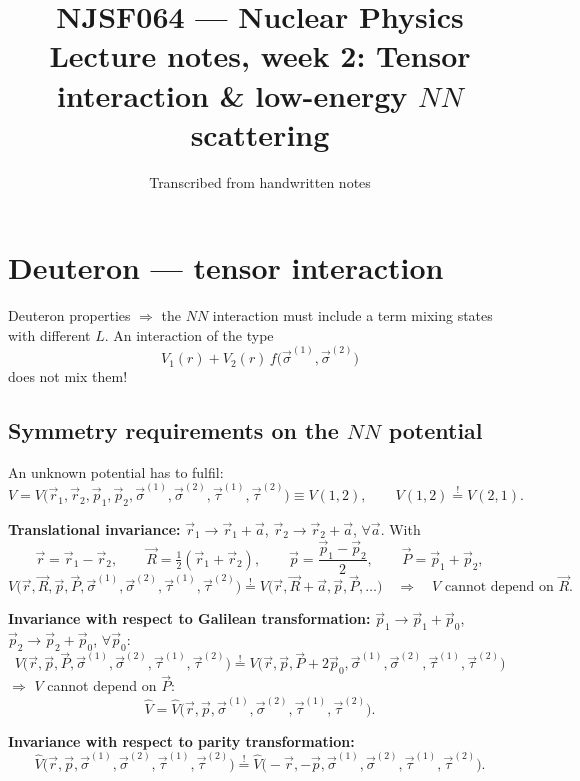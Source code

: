 \documentclass[11pt,a4paper]{article}
\title{NJSF064 --- Nuclear Physics\\[2mm]\large Lecture notes, week 2: Tensor interaction \& low-energy $NN$ scattering}
\author{Transcribed from handwritten notes}
\date{}
\newcommand{\op}[1]{\hat{#1}}
\begin{document}
\maketitle

\tableofcontents

\section{Deuteron --- tensor interaction}

Deuteron properties $\Rightarrow$ the $NN$ interaction must include a term
mixing states with different $L$. An interaction of the type
\[
V_1(r)+V_2(r)\,f\big(\vec\sigma^{(1)},\vec\sigma^{(2)}\big)
\]
does not mix them!

\subsection{Symmetry requirements on the \texorpdfstring{$NN$}{NN} potential}

An unknown potential has to fulfil:
\[
V=V\big(\vec r_1,\vec r_2,\vec p_1,\vec p_2,\vec\sigma^{(1)},\vec\sigma^{(2)},
\vec\tau^{(1)},\vec\tau^{(2)}\big)\equiv V(1,2),
\qquad
V(1,2)\stackrel{!}{=}V(2,1).
\]

\textbf{Translational invariance:} $\vec r_1\to\vec r_1+\vec a$,
$\vec r_2\to\vec r_2+\vec a$, $\forall\vec a$. With
\[
\vec r=\vec r_1-\vec r_2,\qquad \vec R=\tfrac12(\vec r_1+\vec r_2),\qquad
\vec p=\frac{\vec p_1-\vec p_2}{2},\qquad \vec P=\vec p_1+\vec p_2,
\]
\[
V\big(\vec r,\vec R,\vec p,\vec P,\vec\sigma^{(1)},\vec\sigma^{(2)},\vec\tau^{(1)},\vec\tau^{(2)}\big)
\stackrel{!}{=}V\big(\vec r,\vec R+\vec a,\vec p,\vec P,\dots\big)
\quad\Rightarrow\quad V \text{ cannot depend on } \vec R .
\]

\textbf{Invariance with respect to Galilean transformation:}
$\vec p_1\to\vec p_1+\vec p_0$, $\vec p_2\to\vec p_2+\vec p_0$, $\forall\vec p_0$:
\[
V\big(\vec r,\vec p,\vec P,\vec\sigma^{(1)},\vec\sigma^{(2)},\vec\tau^{(1)},\vec\tau^{(2)}\big)
\stackrel{!}{=}V\big(\vec r,\vec p,\vec P+2\vec p_0,\vec\sigma^{(1)},\vec\sigma^{(2)},\vec\tau^{(1)},\vec\tau^{(2)}\big)
\]
$\Rightarrow$ $V$ cannot depend on $\vec P$:
\[
\op V=\op V\big(\vec r,\vec p,\vec\sigma^{(1)},\vec\sigma^{(2)},\vec\tau^{(1)},\vec\tau^{(2)}\big).
\]

\textbf{Invariance with respect to parity transformation:}
\[
\op V\big(\vec r,\vec p,\vec\sigma^{(1)},\vec\sigma^{(2)},\vec\tau^{(1)},\vec\tau^{(2)}\big)
\stackrel{!}{=}\op V\big(-\vec r,-\vec p,\vec\sigma^{(1)},\vec\sigma^{(2)},\vec\tau^{(1)},\vec\tau^{(2)}\big).
\]
\end{document}
